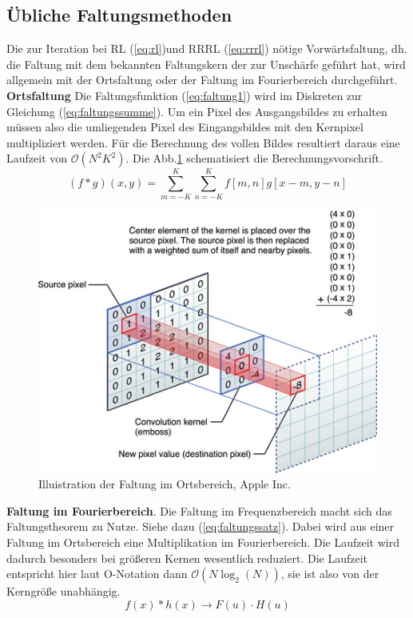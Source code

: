 \documentclass[a4paper,12pt]{article}
\begin{document}
\subsection{Übliche Faltungsmethoden}\label{chp:faltungen}
Die zur Iteration bei RL (\ref{eq:rl})und RRRL (\ref{eq:rrrl}) nötige
Vorwärtsfaltung, dh. die Faltung mit dem bekannten Faltungskern der zur
Unschärfe geführt hat, wird allgemein mit der Ortsfaltung oder der Faltung
im Fourierbereich durchgeführt.\\
\textbf{Ortsfaltung} Die Faltungsfunktion (\ref{eq:faltung1}) wird im Diskreten
zur Gleichung (\ref{eq:faltungssumme}). Um ein Pixel des Ausgangsbildes zu
erhalten müssen also die umliegenden Pixel des Eingangsbildes mit den Kernpixel
multipliziert werden. Für die Berechnung des vollen Bildes resultiert daraus
eine Laufzeit von $\mathcal O(N^2K^2)$. Die Abb.\ref{figure_AppleFaltung}
schematisiert die Berechnungsvorschrift.
\begin{equation} \label{eq:faltungssumme}
(f*g)(x,y) =  \sum_{m=-K}^{K} \sum_{n=-K}^{K}{f[m,n] g[x-m,y-n]}
\end{equation}

\begin{figure}[htbp]
\centering
\includegraphics[scale=0.6]{apple_kernel_convolution.png}
\caption{Illuistration der Faltung im Ortsbereich, Apple
Inc.\cite{applevImage}}%
\label{figure_AppleFaltung}
\end{figure}

\textbf{Faltung im Fourierbereich}. Die Faltung im Frequenzbereich macht
sich das Faltungstheorem zu Nutze. Siehe dazu (\ref{eq:faltungssatz}). Dabei wird aus
einer Faltung im Ortsbereich eine Multiplikation im Fourierbereich. Die Laufzeit
wird dadurch besonders bei größeren Kernen wesentlich reduziert. Die Laufzeit
entspricht hier laut O-Notation dann $\mathcal O(N\log_2 (N))$, sie ist also von
der Kerngröße unabhängig.
\begin{equation} \label{eq:faltungssatz}
f(x) * h(x) \rightarrow F(u) \cdot H(u)  
\end{equation}
\end{document}
